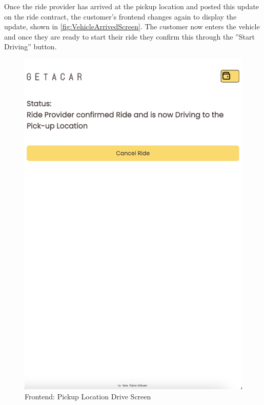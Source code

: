Once the ride provider has arrived at the pickup location and posted this update on the ride contract, the customer's frontend changes again to display the update, shown in \ref{fig:VehicleArrivedScreen}. The customer now enters the vehicle and once they are ready to start their ride they confirm this through the ''Start Driving'' button.


\begin{figure}[H]
    \centering
    
    \begin{minipage}{0.45\linewidth}
        \centering
        \includegraphics[width=\linewidth]{data/ffss/7.png}
        \caption{Frontend: Pickup Location Drive Screen}
        \label{fig:PickupLocationDriveScreen}
    \end{minipage}

\end{figure}
